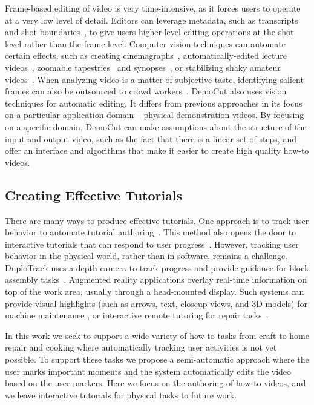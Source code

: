  Frame-based editing of video is very time-intensive, as it forces users to operate at a very low level of detail. Editors can leverage metadata, such as transcripts~\cite{Berthouzoz:2012} and shot boundaries~\cite{Casares:2002dx}, to give users higher-level editing operations at the shot level rather than the frame level.
Computer vision techniques can automate certain effects, such as creating cinemagraphs~\cite{Bai:2012, Joshi:2012}, automatically-edited lecture videos~\cite{Heck:2007}, zoomable tapestries~\cite{Barnes:2010} and synopses~\cite{Pritch:2009vl}, or stabilizing shaky amateur videos~\cite{Liu:2011}. When analyzing video is a matter of subjective taste, identifying salient frames can also be outsourced to crowd workers~\cite{Bernstein:2011uj}. DemoCut also uses vision techniques for automatic editing. It differs from previous approaches in its focus on a particular application domain -- physical demonstration videos. By focusing on a specific domain, DemoCut can make assumptions about the structure of the input and output video, such as the fact that there is a linear set of steps, and offer an interface and algorithms that make it easier to create high quality how-to videos.

\subsection{Creating Effective Tutorials}
There are many ways to produce effective tutorials. One approach is to track user behavior to automate tutorial authoring~\cite{Grabler:2009jj, Grossman:2010jz, Chi:2012:MAG:2380116.2380130}. This method also opens the door to interactive tutorials that can respond to user progress~\cite{Bergman:2005:DocWizards, Pongnumkul:2011ju}. However, tracking user behavior in the physical world, rather than in software, remains a challenge.  DuploTrack uses a depth camera to track progress and provide guidance for block assembly tasks~\cite{Gupta2012DuploTrack}.
Augmented reality applications overlay real-time information on top of the work area, usually through a head-mounted display. Such systems can provide visual highlights (such as arrows, text, closeup views, and 3D models) for machine maintenance \cite{Henderson:2011ff}, or interactive remote tutoring for repair tasks~\cite{Gurevich:2012ko}.

In this work we seek to support a wide variety of how-to tasks from craft to home repair and cooking where automatically tracking user activities is not yet possible. To support these tasks we propose a semi-automatic approach where the user marks important moments and the system automatically edits the video based on the user markers. Here we focus on the authoring of how-to videos, and we leave interactive tutorials for physical tasks to future work.
